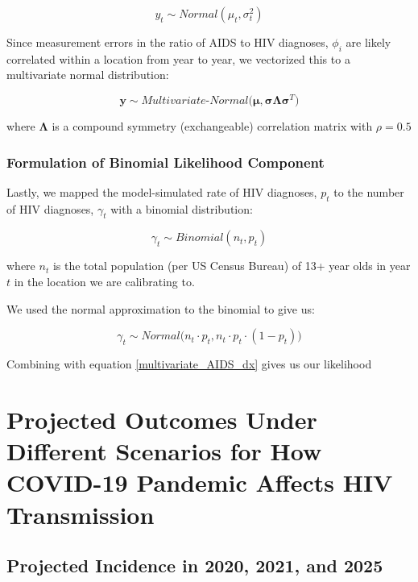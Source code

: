 \documentclass{article}
\begin{document}
\begin{equation}
	y_t \sim Normal(\mu_t, \sigma^2_t)
\end{equation}

Since measurement errors in the ratio of AIDS to HIV diagnoses, $\phi_i$ are likely correlated within a location from year to year, we vectorized this to a multivariate normal distribution: 

\begin{equation} \label{multivariate_AIDS_dx}
	\bm{y} \sim Multivariate\text{-}Normal\big(\bm{\mu}, \bm{\sigma} \bm{\Lambda} \bm{\sigma}^T \big)
\end{equation}

where $\bm{\Lambda}$ is a compound symmetry (exchangeable) correlation matrix with $\rho=0.5$

\subsubsection{Formulation of Binomial Likelihood Component}

Lastly, we mapped the model-simulated rate of HIV diagnoses, $p_t$ to the number of HIV diagnoses, $\gamma_t$ with a binomial distribution:

\begin{equation}
	\gamma_t \sim Binomial(n_t, p_t)
\end{equation}

where $n_t$ is the total population (per US Census Bureau) of 13+ year olds in year $t$ in the location we are calibrating to.

We used the normal approximation to the binomial to give us:

\begin{equation}
	\gamma_t \sim Normal\big(n_t \cdot p_t, n_t \cdot p_t \cdot (1-p_t)\big)
\end{equation}

Combining with equation \ref{multivariate_AIDS_dx} gives us our likelihood



\section{Projected Outcomes Under Different Scenarios for How COVID-19 Pandemic Affects HIV Transmission}



\subsection{Projected Incidence in 2020, 2021, and 2025}
\end{document}
